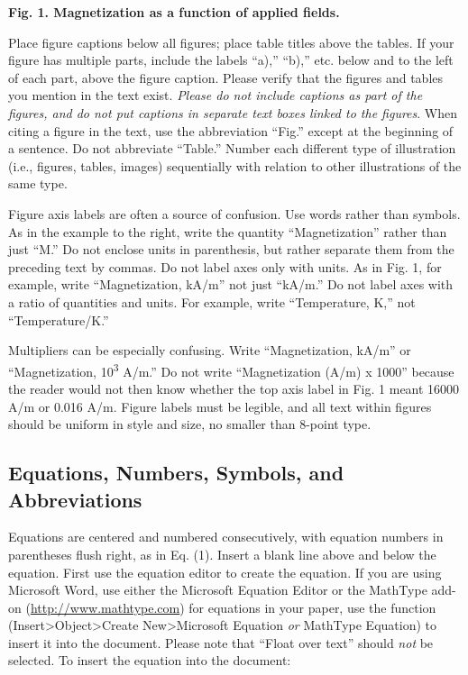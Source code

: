 \textbf{Fig. 1. Magnetization as a function of applied fields.}

Place figure captions below all figures; place table titles above the
tables. If your figure has multiple parts, include the labels ``a),''
``b),'' etc. below and to the left of each part, above the figure
caption. Please verify that the figures and tables you mention in the
text exist. \emph{Please do not include captions as part of the figures,
and do not put captions in separate text boxes linked to the figures}.
When citing a figure in the text, use the abbreviation ``Fig.'' except
at the beginning of a sentence. Do not abbreviate ``Table.'' Number each
different type of illustration (i.e., figures, tables, images)
sequentially with relation to other illustrations of the same type.

Figure axis labels are often a source of confusion. Use words rather
than symbols. As in the example to the right, write the quantity
``Magnetization'' rather than just ``M.'' Do not enclose units in
parenthesis, but rather separate them from the preceding text by commas.
Do not label axes only with units. As in Fig. 1, for example, write
``Magnetization, kA/m'' not just ``kA/m.'' Do not label axes with a
ratio of quantities and units. For example, write ``Temperature, K,''
not ``Temperature/K.''

Multipliers can be especially confusing. Write ``Magnetization, kA/m''
or ``Magnetization, 10\textsuperscript{3} A/m.'' Do not write
``Magnetization (A/m) x 1000'' because the reader would not then know
whether the top axis label in Fig. 1 meant 16000 A/m or 0.016 A/m.
Figure labels must be legible, and all text within figures should be
uniform in style and size, no smaller than 8-point type.

\subsection{Equations, Numbers, Symbols, and
Abbreviations}\label{equations-numbers-symbols-and-abbreviations}

Equations are centered and numbered consecutively, with equation numbers
in parentheses flush right, as in Eq. (1). Insert a blank line above and
below the equation. First use the equation editor to create the
equation. If you are using Microsoft Word, use either the Microsoft
Equation Editor or the MathType add-on
(\href{http://www.mathtype.com}{\ul{http://www.mathtype.com}}) for
equations in your paper, use the function
(Insert\textgreater Object\textgreater Create New\textgreater Microsoft
Equation \emph{or} MathType Equation) to insert it into the document.
Please note that ``Float over text'' should \emph{not} be selected. To
insert the equation into the document:

